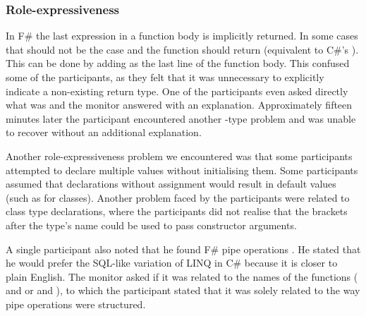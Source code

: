 \subsubsection{Role-expressiveness}
In F\# the last expression in a function body is implicitly returned. In some cases that should not be the case and the function should return  (equivalent to C\#'s ). This can be done by adding \ttt{()} as the last line of the function body. This confused some of the participants, as they felt that it was unnecessary to explicitly indicate a non-existing return type. One of the participants even asked directly what  was and the monitor answered with an explanation. Approximately fifteen minutes later the participant encountered another -type problem and was unable to recover without an additional explanation.

Another role-expressiveness problem we encountered was that some participants attempted to  declare multiple values without initialising them. Some participants assumed that  declarations without assignment would result in default values (such as  for classes). Another problem faced by the participants were related to class type declarations, where the participants did not realise that the brackets after the type's name could be used to pass constructor arguments.

A single participant also noted that he found F\# pipe operations \textit{}. He stated that he would prefer the SQL-like variation of \gls{LINQ} in C\# because it is closer to plain English. The monitor asked if it was related to the names of the functions ( and  or  and ), to which the participant stated that it was solely related to the way pipe operations were structured.
